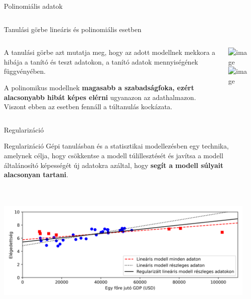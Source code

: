 \documentclass[english, aspectratio=169]{beamer}
\begin{document}
\begin{frame}{Polinomiális adatok}
\begin{columns}
\begin{column}{.5\textwidth}
{\begin{center}
\end{center}}
\end{column}
\end{columns}
\end{frame}

\begin{frame}{Tanulási görbe lineáris és polinomiális esetben}
\begin{columns}
\begin{column}{.5\textwidth}
A tanulási görbe azt mutatja meg, hogy az adott modellnek mekkora a hibája a tanító és teszt adatokon, a tanító adatok mennyiségének függvényében.\par\medskip
A polinomikus modellnek \textbf{magasabb a szabadságfoka, ezért alacsonyabb hibát képes elérni} ugyanazon az adathalmazon. Viszont ebben az esetben fennáll a túltanulás kockázata. 
\end{column}
\begin{column}{.5\textwidth}
\begin{center}
\includegraphics<1>[width=7cm, height=7cm, keepaspectratio]{images/regularization_8.png}
\includegraphics<2>[width=7cm, height=7cm, keepaspectratio]{images/regularization_9.png}
\end{center}
\end{column}
\end{columns}
\end{frame}

\begin{frame}{Regularizáció}
\begin{block}{Regularizáció}
Gépi tanulásban és a statisztikai modellezésben egy technika, amelynek célja, hogy csökkentse a modell túlillesztését és javítsa a modell általánosító képességét új adatokra azáltal, hogy \textbf{segít a modell súlyait alacsonyan tartani}.
\end{block}
\begin{center}
\includegraphics[width=13cm, height=7cm, keepaspectratio]{images/regularization_10.png}
\end{center}
\end{frame}
\end{document}
